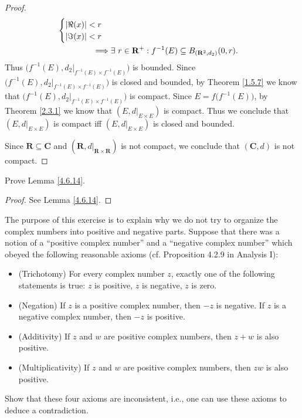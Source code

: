 \begin{proof}
\begin{align*}
\begin{cases}
                                                                      \abs*{\Re(x)} < r \\
                                                                      \abs*{\Im(x)} < r
                                                                  \end{cases}                                                                        \\
        \implies & \exists\ r \in \mathbf{R}^+ : f^{-1}(E) \subseteq B_{(\mathbf{R}^2, d_2)}(0, r).
    \end{align*}
    Thus \(\big(f^{-1}(E), d_2|_{f^{-1}(E) \times f^{-1}(E)}\big)\) is bounded.
    Since \(\big(f^{-1}(E), d_2|_{f^{-1}(E) \times f^{-1}(E)}\big)\) is closed and bounded, by Theorem \ref{1.5.7} we know that \(\big(f^{-1}(E), d_2|_{f^{-1}(E) \times f^{-1}(E)}\big)\) is compact.
    Since \(E = f\big(f^{-1}(E)\big)\), by Theorem \ref{2.3.1} we know that \((E, d|_{E \times E})\) is compact.
    Thus we conclude that \((E, d|_{E \times E})\) is compact iff \((E, d|_{E \times E})\) is closed and bounded.

    Since \(\mathbf{R} \subseteq \mathbf{C}\) and \((\mathbf{R}, d|_{\mathbf{R} \times \mathbf{R}})\) is not compact, we conclude that \((\mathbf{C}, d)\) is not compact.
\end{proof}

\begin{exercise}\label{ex 4.6.14}
    Prove Lemma \ref{4.6.14}.
\end{exercise}

\begin{proof}
    See Lemma \ref{4.6.14}.
\end{proof}

\begin{exercise}\label{ex 4.6.15}
    The purpose of this exercise is to explain why we do not try to organize the complex numbers into positive and negative parts.
    Suppose that there was a notion of a ``positive complex number'' and a ``negative complex number'' which obeyed the following reasonable axioms (cf. Proposition 4.2.9 in Analysis I):
    \begin{itemize}
        \item (Trichotomy)
              For every complex number \(z\), exactly one of the following statements is true:
              \(z\) is positive, \(z\) is negative, \(z\) is zero.
        \item (Negation)
              If \(z\) is a positive complex number, then \(-z\) is negative.
              If \(z\) is a negative complex number, then \(-z\) is positive.
        \item (Additivity)
              If \(z\) and \(w\) are positive complex numbers, then \(z + w\) is also positive.
        \item (Multiplicativity)
              If \(z\) and \(w\) are positive complex numbers, then \(zw\) is also positive.
    \end{itemize}
    Show that these four axioms are inconsistent, i.e., one can use these axioms to deduce a contradiction.
\end{exercise}

